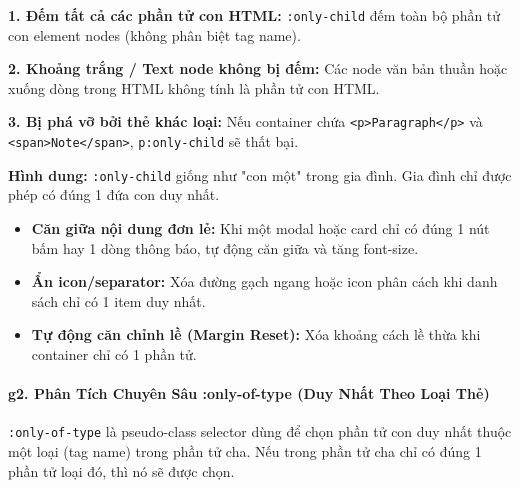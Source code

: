 \documentclass[11pt,oneside]{book}
\newcommand{\codeinline}[1]{\textcolor{accentOrange}{\texttt{#1}}}
\begin{document}
\begin{warnBox}
\textbf{1. Đếm tất cả các phần tử con HTML:} \codeinline{:only-child} đếm toàn bộ phần tử con element nodes (không phân biệt tag name).
\par\vspace{4pt}
\textbf{2. Khoảng trắng / Text node không bị đếm:} Các node văn bản thuần hoặc xuống dòng trong HTML không tính là phần tử con HTML.
\par\vspace{4pt}
\textbf{3. Bị phá vỡ bởi thẻ khác loại:} Nếu container chứa \codeinline{<p>Paragraph</p>} và \codeinline{<span>Note</span>}, \codeinline{p:only-child} sẽ thất bại.
\end{warnBox}

\begin{tipBox}
\textbf{Hình dung:} \codeinline{:only-child} giống như "con một" trong gia đình. Gia đình chỉ được phép có đúng 1 đứa con duy nhất.
\end{tipBox}

\begin{conceptBox}
\begin{itemize}[leftmargin=1.5em, itemsep=3pt, parsep=0pt]
    \item \textbf{Căn giữa nội dung đơn lẻ:} Khi một modal hoặc card chỉ có đúng 1 nút bấm hay 1 dòng thông báo, tự động căn giữa và tăng font-size.
    \item \textbf{Ẩn icon/separator:} Xóa đường gạch ngang hoặc icon phân cách khi danh sách chỉ có 1 item duy nhất.
    \item \textbf{Tự động căn chỉnh lề (Margin Reset):} Xóa khoảng cách lề thừa khi container chỉ có 1 phần tử.
\end{itemize}
\end{conceptBox}


\paragraph{g2. Phân Tích Chuyên Sâu :only-of-type (Duy Nhất Theo Loại Thẻ)}
\mbox{}\par\vspace{2pt}

\codeinline{:only-of-type} là pseudo-class selector dùng để chọn phần tử con duy nhất thuộc một loại (tag name) trong phần tử cha. Nếu trong phần tử cha chỉ có đúng 1 phần tử loại đó, thì nó sẽ được chọn.
\end{document}
